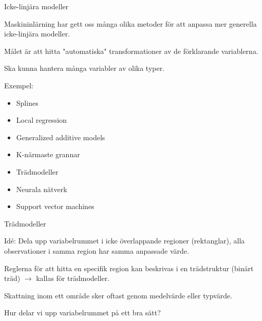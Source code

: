 \documentclass[10pt,english]{beamer}
\begin{document}
\begin{frame}{Icke-linjära modeller}
    
    Maskininlärning har gett oss många olika metoder för att anpassa mer generella icke-linjära modeller.

    \begin{greenbox}
        Målet är att hitta "automatiska" transformationer av de förklarande variablerna.
    \end{greenbox}

    Ska kunna hantera många variabler av olika typer.

    Exempel:
    \begin{itemize}
         \item Splines
        \item Local regression
        \item Generalized additive models
        \item K-närmaste grannar
        \item Trädmodeller
        \item Neurala nätverk
        \item Support vector machines
        
    \end{itemize}

\end{frame}

\begin{frame}{Trädmodeller}
    \begin{greenbox}
        Idé: Dela upp variabelrummet i icke överlappande regioner (rektanglar), alla observationer i samma region har samma anpassade värde.
    \end{greenbox}

    Reglerna för att hitta en specifik region kan beskrivas i en trädstruktur (binärt träd) $\rightarrow$ kallas för trädmodeller.

    Skattning inom ett område sker oftast genom medelvärde eller typvärde.

    Hur delar vi upp variabelrummet på ett bra sätt?
\end{frame}
\end{document}
